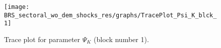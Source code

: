 \begin{figure}[H]
\centering
  \texttt{[image: BRS\_sectoral\_wo\_dem\_shocks\_res/graphs/TracePlot\_Psi\_K\_blck\_1]}\\
    \caption{Trace plot for parameter ${\Psi_{K}}$ (block number 1).}
\end{figure}
